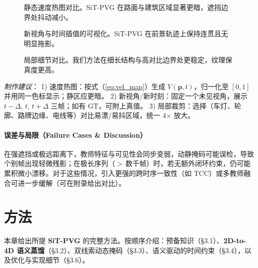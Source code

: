 \documentclass[10pt,conference]{IEEEtran} %
\begin{document}
\begin{figure}[t]
\centering
{}
\caption{静态速度热图对比。SiT\mbox{-}PVG 在路面与建筑区域显著更暗，遮挡边界处抖动减小。}
\label{fig:velmap}
\end{figure}

\begin{figure}[t]
\centering
{}
\caption{新视角与时间插值的可视化。SiT\mbox{-}PVG 在前景轨迹上保持连贯且无明显拖影。}
\label{fig:nvs}
\end{figure}

\begin{figure}[t]
\centering
{}
\caption{局部细节对比。我们方法在细长结构与高对比边界处更稳定，纹理保真度更高。}
\label{fig:crops}
\end{figure}

\noindent
\emph{制作建议}：  
1) 速度热图：按式（\ref{eq:vel_map}）生成 $V(\mathbf p,t)$，归一化至 $[0,1]$ 并用同一色标显示；静区应更暗。  
2) 新视角/新时刻：固定一个未见视角，展示 $t{-}\Delta,\,t,\,t{+}\Delta$ 三帧；如有 GT，可附上真值。  
3) 局部裁剪：选择（车灯、轮廓、路牌边缘、电线等）对比易漂/易抖区域，统一 4$\times$ 放大。  

\paragraph{误差与局限（Failure Cases \& Discussion）}
在强遮挡或极远距离下，教师特征与可见性会同步变弱，动静掩码可能误检，导致个别帧出现轻微残影；在极长序列（$>$\,$\!$数千帧）时，若无额外闭环约束，仍可能累积微小漂移。对于这些情况，引入更强的跨时序一致性（如 TCC）或多教师融合可进一步缓解（可在附录给出对比）。

\section{方法}
本章给出所提 \textbf{SiT\mbox{-}PVG} 的完整方法。按顺序介绍：预备知识（§3.1）、\textbf{2D\mbox{-}to\mbox{-}4D 语义蒸馏}（§3.2）、双线索动态掩码（§3.3）、语义驱动的时间约束（§3.4），以及优化与实现细节（§3.6）。
\end{document}
